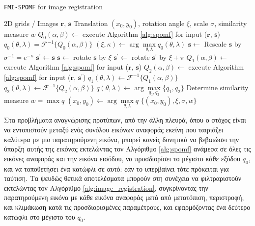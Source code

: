 \begin{algorithm}
  \renewcommand{\arraystretch}{1.3}
  \caption{\texttt{FMI-SPOMF} for image registration}
  \label{alg:image_registration}
  \begin{spacing}{1.2}
  \begin{algorithmic}[1]
    \REQUIRE 2D grids / Images $\bm{r}$, $\bm{s}$
    \ENSURE Translation $(x_0,y_0)$, rotation angle $\xi$, scale $\sigma$, similarity measure $w$
    \STATE $Q_0(\alpha,\beta) \leftarrow$ execute Algorithm \ref{alg:spomf} for input ($\bm{r}$, $\bm{s}$)
    \STATE $q_0(\theta,\lambda) = \mathcal{F}^{-1}\{Q_0(\alpha, \beta)\}$
    \STATE $(\xi, \kappa) \leftarrow \arg\max\limits_{\theta,\lambda}{q_0(\theta, \lambda)}$
    \STATE $\bm{s} \leftarrow$ Rescale $\bm{s}$ by $\sigma^{-1} = e^{-\kappa}$
    \STATE $\bm{s}^{\prime} \leftarrow \bm{s}$
    \STATE $\bm{s} \leftarrow$          rotate $\bm{s}$ by $\xi$
    \STATE $\bm{s}^{\prime} \leftarrow$ rotate $\bm{s}^{\prime}$ by $\xi + \pi$
    \STATE $Q_1(\alpha,\beta) \leftarrow$ execute Algorithm \ref{alg:spomf} for input ($\bm{r}$, $\bm{s}$)
    \STATE $Q_2(\alpha,\beta) \leftarrow$ execute Algorithm \ref{alg:spomf} for input ($\bm{r}$, $\bm{s}^{\prime}$)
    \STATE $q_1(\theta,\lambda) \leftarrow \mathcal{F}^{-1}\{Q_1(\alpha, \beta)\}$
    \STATE $q_2(\theta,\lambda) \leftarrow \mathcal{F}^{-1}\{Q_2(\alpha, \beta)\}$
    \STATE $q(\theta,\lambda) \leftarrow \arg\max\limits_{q_1,q_2}\{q_1, q_2\}$
    \STATE Determine similarity measure $w = \max q$
    \STATE $(x_0,y_0) \leftarrow \arg\max\limits_{\theta,\lambda}{q}$
    \RETURN $\{(x_0,y_0), \xi, \sigma, w\}$
  \end{algorithmic}
  \end{spacing}
\end{algorithm}

Στα προβλήματα αναγνώρισης προτύπων, από την άλλη πλευρά, όπου ο στόχος είναι
να εντοπιστούν μεταξύ ενός συνόλου εικόνων αναφοράς εκείνη που ταιριάζει
καλύτερα με μια παρατηρούμενη εικόνα, μπορεί κανείς δυνητικά να βεβαιώσει την
ύπαρξη αυτής της εικόνας εκτελώντας τον Αλγόριθμο \ref{alg:spomf} ανάμεσα σε
όλες τις εικόνες αναφοράς και την εικόνα εισόδου, να προσδιορίσει το μέγιστο
κάθε εξόδου $q_0$, και να τοποθετήσει ένα κατώφλι σε αυτό: εάν το υπερβαίνει
τότε πρόκειται για ταύτιση. Τα ψευδώς θετικά αποτελέσματα μπορούν στη συνέχεια
να φιλτραριστούν εκτελώντας τον Αλγόριθμο \ref{alg:image_registration},
συγκρίνοντας την παρατηρούμενη εικόνα με κάθε εικόνα αναφοράς μετά από
μετατόπιση, περιστροφή, και κλιμάκωση κατά τις προσδιορισμένες παραμέτρους, και
εφαρμόζοντας ένα δεύτερο κατώφλι στο μέγιστο του $q_0$.



